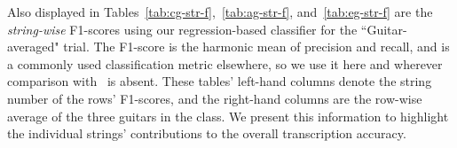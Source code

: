 \documentclass[12pt]{cmuthesis}
\begin{document}

Also displayed in Tables~\ref{tab:cg-str-f},~\ref{tab:ag-str-f}, and~\ref{tab:eg-str-f} are the \textit{string-wise} F1-scores using our regression-based classifier for the ``Guitar-averaged" trial. The F1-score is the harmonic mean of precision and recall, and is a commonly used classification metric elsewhere, so we use it here and wherever comparison with~\cite{barbanchoi2012} is absent. These tables' left-hand columns denote the string number of the rows' F1-scores, and the right-hand columns are the row-wise average of the three guitars in the class. We present this information to highlight the individual strings' contributions to the overall transcription accuracy.
\end{document}
